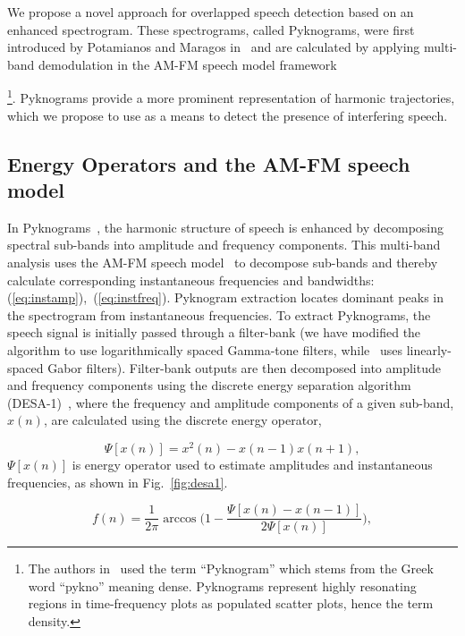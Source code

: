 We propose a novel approach for overlapped speech detection based on an enhanced spectrogram. 
These spectrograms, called Pyknograms, were first introduced by Potamianos and Maragos in~\cite{potamianos_maragos_icassp95,potamianos_maragos_jasa96} and are calculated by applying multi-band demodulation in the AM-FM speech model framework~\cite{maragos_kaiser_quatieri}{\footnote{The authors in~\cite{potamianos_maragos_jasa96} used the term ``Pyknogram'' which stems from the Greek word ``pykno'' meaning dense. Pyknograms represent highly resonating regions in time-frequency plots as populated scatter plots, hence the term density.}. 
Pyknograms provide a more prominent representation of harmonic trajectories, which we propose to use as a means to detect the presence of interfering speech.


\subsection{Energy Operators and the AM-FM speech model}

In Pyknograms~\cite{potamianos_maragos_jasa96}, the harmonic structure of speech is enhanced by decomposing spectral sub-bands into amplitude and frequency components. 
This multi-band analysis uses the AM-FM speech model~\cite{maragos_kaiser_quatieri} to decompose sub-bands and thereby calculate corresponding instantaneous frequencies and bandwidths: (\ref{eq:instamp}),~(\ref{eq:instfreq}). 
Pyknogram extraction locates dominant peaks in the spectrogram from instantaneous frequencies. 
To extract Pyknograms, the speech signal is initially passed through a filter-bank (we have modified the algorithm to use logarithmically spaced Gamma-tone filters, while~\cite{potamianos_maragos_jasa96} uses linearly-spaced Gabor filters). 
Filter-bank outputs are then decomposed into amplitude and frequency components using the discrete energy separation algorithm (DESA-1)~\cite{maragos_kaiser_quatieri}, where the frequency and amplitude components of a given sub-band, $x(n)$, are calculated using the discrete energy operator,
 

\begin{equation}
\Psi [x(n)] = x^2(n)-x(n-1)x(n+1),
\end{equation}
$\Psi [x(n)]$ is energy operator used to estimate amplitudes and instantaneous frequencies, as shown in Fig.~\ref{fig:desa1}. 


\begin{equation}
\label{eq:instfreq}
f(n) = \frac{1}{2\pi}\arccos \Big (1-\frac{\Psi[x(n)-x(n-1)]}{2\Psi[x(n)]}\Big),
\end{equation}
 
}
